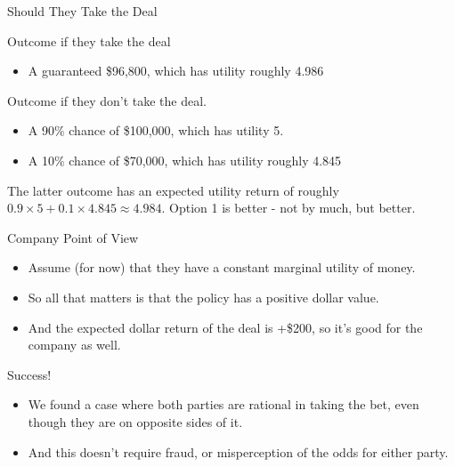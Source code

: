 \documentclass[
  ignorenonframetext,
]{beamer}
\providecommand{\tightlist}{%
  \setlength{\itemsep}{0pt}\setlength{\parskip}{0pt}}
\renewcommand{\,}{\text{, }}
\begin{document}
\begin{frame}{Should They Take the Deal}
\protect\hypertarget{should-they-take-the-deal-2}{}

Outcome if they take the deal

\begin{itemize}
\tightlist
\item
  A guaranteed \$96,800, which has utility roughly 4.986 \pause
\end{itemize}

Outcome if they don't take the deal.

\begin{itemize}
\tightlist
\item
  A 90\% chance of \$100,000, which has utility 5.
\item
  A 10\% chance of \$70,000, which has utility roughly 4.845 \pause
\end{itemize}

The latter outcome has an expected utility return of roughly
\(0.9 \times 5 + 0.1 \times 4.845 \approx 4.984\). Option 1 is better -
not by much, but better.

\end{frame}

\begin{frame}{Company Point of View}
\protect\hypertarget{company-point-of-view}{}

\begin{itemize}
\tightlist
\item
  Assume (for now) that they have a constant marginal utility of money.
\item
  So all that matters is that the policy has a positive dollar value.
\item
  And the expected dollar return of the deal is +\$200, so it's good for
  the company as well.
\end{itemize}

\end{frame}

\begin{frame}{Success!}
\protect\hypertarget{success}{}

\begin{itemize}
\tightlist
\item
  We found a case where both parties are rational in taking the bet,
  even though they are on opposite sides of it.
\item
  And this doesn't require fraud, or misperception of the odds for
  either party.
\end{itemize}

\end{frame}
\end{document}
